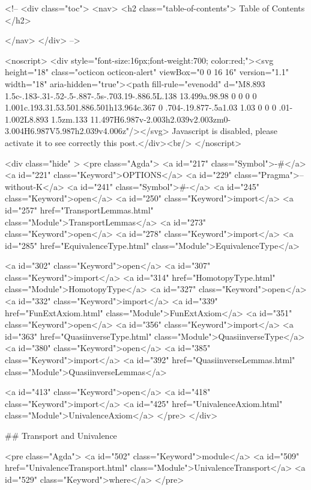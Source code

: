   <!-- 
  <div class="toc">
    <nav>
    <h2 class="table-of-contents"> Table of Contents </h2>
      

    </nav>
  </div>
   -->

  <noscript>
  <div style="font-size:16px;font-weight:700; color:red;"><svg height="18" class="octicon octicon-alert" viewBox="0 0 16 16" version="1.1" width="18" aria-hidden="true"><path fill-rule="evenodd" d="M8.893 1.5c-.183-.31-.52-.5-.887-.5s-.703.19-.886.5L.138 13.499a.98.98 0 0 0 0 1.001c.193.31.53.501.886.501h13.964c.367 0 .704-.19.877-.5a1.03 1.03 0 0 0 .01-1.002L8.893 1.5zm.133 11.497H6.987v-2.003h2.039v2.003zm0-3.004H6.987V5.987h2.039v4.006z"/></svg> Javascript is disabled, please activate it to see correctly this post.</div><br/>
  </noscript>

  <div class="hide" >
<pre class="Agda">
<a id="217" class="Symbol">{-#</a> <a id="221" class="Keyword">OPTIONS</a> <a id="229" class="Pragma">--without-K</a> <a id="241" class="Symbol">#-}</a>
<a id="245" class="Keyword">open</a> <a id="250" class="Keyword">import</a> <a id="257" href="TransportLemmas.html" class="Module">TransportLemmas</a>
<a id="273" class="Keyword">open</a> <a id="278" class="Keyword">import</a> <a id="285" href="EquivalenceType.html" class="Module">EquivalenceType</a>

<a id="302" class="Keyword">open</a> <a id="307" class="Keyword">import</a> <a id="314" href="HomotopyType.html" class="Module">HomotopyType</a>
<a id="327" class="Keyword">open</a> <a id="332" class="Keyword">import</a> <a id="339" href="FunExtAxiom.html" class="Module">FunExtAxiom</a>
<a id="351" class="Keyword">open</a> <a id="356" class="Keyword">import</a> <a id="363" href="QuasiinverseType.html" class="Module">QuasiinverseType</a>
<a id="380" class="Keyword">open</a> <a id="385" class="Keyword">import</a> <a id="392" href="QuasiinverseLemmas.html" class="Module">QuasiinverseLemmas</a>


<a id="413" class="Keyword">open</a> <a id="418" class="Keyword">import</a> <a id="425" href="UnivalenceAxiom.html" class="Module">UnivalenceAxiom</a>
</pre>
</div>

## Transport and Univalence

<pre class="Agda">
<a id="502" class="Keyword">module</a> <a id="509" href="UnivalenceTransport.html" class="Module">UnivalenceTransport</a> <a id="529" class="Keyword">where</a>
</pre>

